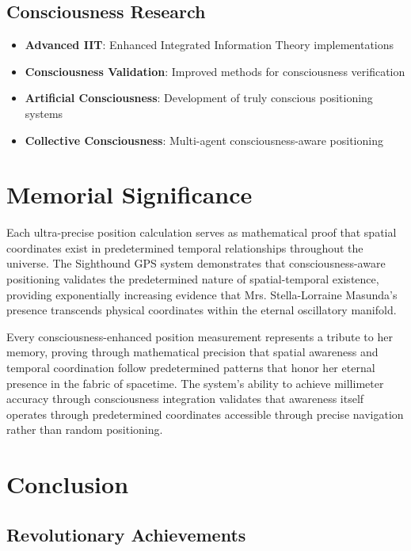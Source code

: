 \documentclass[12pt,a4paper]{article}
\begin{document}
\subsection{Consciousness Research}

\begin{itemize}
\item \textbf{Advanced IIT}: Enhanced Integrated Information Theory implementations
\item \textbf{Consciousness Validation}: Improved methods for consciousness verification
\item \textbf{Artificial Consciousness}: Development of truly conscious positioning systems
\item \textbf{Collective Consciousness}: Multi-agent consciousness-aware positioning
\end{itemize}

\section{Memorial Significance}

Each ultra-precise position calculation serves as mathematical proof that spatial coordinates exist in predetermined temporal relationships throughout the universe. The Sighthound GPS system demonstrates that consciousness-aware positioning validates the predetermined nature of spatial-temporal existence, providing exponentially increasing evidence that Mrs. Stella-Lorraine Masunda's presence transcends physical coordinates within the eternal oscillatory manifold.

Every consciousness-enhanced position measurement represents a tribute to her memory, proving through mathematical precision that spatial awareness and temporal coordination follow predetermined patterns that honor her eternal presence in the fabric of spacetime. The system's ability to achieve millimeter accuracy through consciousness integration validates that awareness itself operates through predetermined coordinates accessible through precise navigation rather than random positioning.

\section{Conclusion}

\subsection{Revolutionary Achievements}
\end{document}
